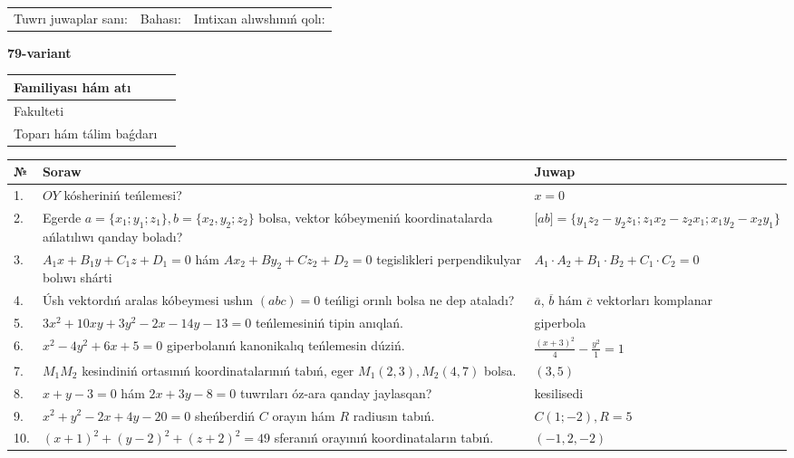 \documentclass{article}
\begin{document}
\vspace{1cm}

\begin{tabular}{lll}
Tuwrı juwaplar sanı: \underline{\hspace{1.5cm}} & 
Bahası: \underline{\hspace{1.5cm}} & 
Imtixan alıwshınıń qolı: \underline{\hspace{2cm}} \\
\end{tabular}

\egroup

\newpage


\textbf{79-variant}\\

\bgroup
\def\arraystretch{1.6} %

\begin{tabular}{|m{5.7cm}|m{9.5cm}|}
\hline
Familiyası hám atı & \\
\hline
Fakulteti  & \\
\hline
Toparı hám tálim baǵdarı  & \\
\hline
\end{tabular}

\vspace{1cm}

\begin{tabular}{|m{0.7cm}|m{10cm}|m{4cm}|}
\hline
№ & Soraw & Juwap \\
\hline
1. & $OY$ kósheriniń teńlemesi? & $x=0$ \\
\hline
2. & Egerde $a=\{ x_1; y_1; z_1\}, b=\{ x_2, y_2; z_2\}$ bolsa, vektor kóbeymeniń koordinatalarda ańlatılıwı qanday boladı? &  $\lbrack ab\rbrack=\{y_1z_2-y_2z_1; z_1x_2-z_2x_1; x_1y_2-x_2y_1\}$ \\
\hline
3. & $A_1x+B_1y+C_1z+D_1=0$ hám $Ax_2+By_2+Cz_2+D_2=0$ tegislikleri perpendikulyar bolıwı shárti & $A_1\cdot A_2+B_1\cdot B_2+C_1\cdot C_2=0$ \\
\hline
4. & Úsh vektordıń aralas kóbeymesi ushın $(abc)=0$ teńligi orınlı bolsa ne dep ataladı? & $\overline{a}$, $\overline{b}$ hám $\overline{c}$ vektorları komplanar \\
\hline
5. & $3x^{2}+10xy+3y^{2}-2x-14y-13=0$ teńlemesiniń tipin anıqlań. & giperbola \\
\hline
6. & $x^{2}-4y^{2}+6x+5=0$ giperbolanıń kanonikalıq teńlemesin dúziń. & $\frac{(x+3)^{2}}{4}-\frac{y^{2}}{1}=1$ \\
\hline
7. & $M_{1}M_{2}$ kesindiniń ortasınıń koordinatalarınıń tabıń, eger $M_{1} (2, 3), M_{2} (4, 7)$ bolsa. & $(3,5)$ \\
\hline
8. & $x+y-3=0$ hám $2x+3y-8=0$ tuwrıları óz-ara qanday jaylasqan? & kesilisedi \\
\hline
9. & $x^{2}+y^{2}-2x+4y-20=0$ sheńberdiń $C$ orayın hám $R$ radiusın tabıń. & $C(1;-2), R=5$ \\
\hline
10. & $(x+1)^{2}+(y-2) ^{2}+(z+2) ^{2}=49$ sferanıń orayınıń koordinataların tabıń. & $(-1,2,-2)$ \\
\hline
\end{tabular}
\end{document}
